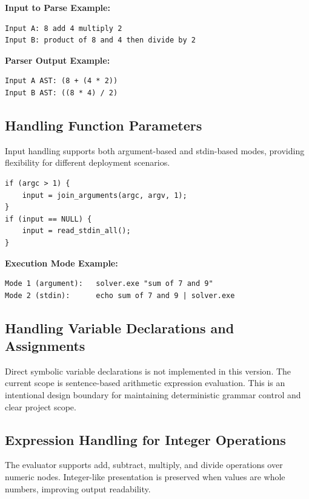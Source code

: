\documentclass[12pt,a4paper]{report}
\begin{document}
\textbf{Input to Parse Example:}
\begin{lstlisting}[style=ccode,caption={Expression forms accepted by grammar}]
Input A: 8 add 4 multiply 2
Input B: product of 8 and 4 then divide by 2
\end{lstlisting}

\textbf{Parser Output Example:}
\begin{lstlisting}[style=ccode,caption={Illustrative AST form}]
Input A AST: (8 + (4 * 2))
Input B AST: ((8 * 4) / 2)
\end{lstlisting}

\subsection{Handling Function Parameters}

Input handling supports both argument-based and stdin-based modes, providing flexibility for different deployment scenarios.

\begin{lstlisting}[style=ccode,caption={Input flow from src/main.c}]
if (argc > 1) {
    input = join_arguments(argc, argv, 1);
}
if (input == NULL) {
    input = read_stdin_all();
}
\end{lstlisting}

\textbf{Execution Mode Example:}
\begin{lstlisting}[style=ccode,caption={CLI invocation and stdin fallback behavior}]
Mode 1 (argument):   solver.exe "sum of 7 and 9"
Mode 2 (stdin):      echo sum of 7 and 9 | solver.exe
\end{lstlisting}

\subsection{Handling Variable Declarations and Assignments}

Direct symbolic variable declarations is not implemented in this version. The current scope
is sentence-based arithmetic expression evaluation. This is an intentional design boundary
for maintaining deterministic grammar control and clear project scope.

\subsection{Expression Handling for Integer Operations}

The evaluator supports add, subtract, multiply, and divide operations over numeric nodes. Integer-like
presentation is preserved when values are whole numbers, improving output readability.
\end{document}

